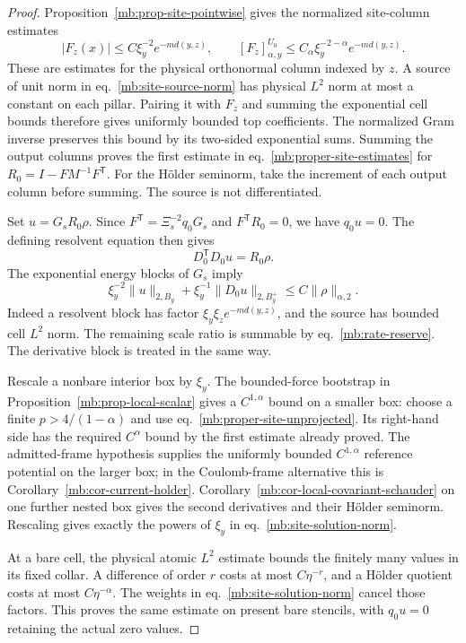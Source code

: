 \documentclass[11pt,letterpaper,reqno]{amsart}
\numberwithin{equation}{section}
\renewcommand{\eqref}[1]{\textup{eq.~\ref{#1}}}
\theoremstyle{definition}
\theoremstyle{remark}
\begin{document}
\begin{proof}
Proposition~\ref{mb:prop-site-pointwise} gives the normalized
site-column estimates
\[
 |F_z(x)|\le C\xi_y^{-2}e^{-m d(y,z)},\qquad
 [F_z]_{\alpha,y}^{U_0}
             \le C_\alpha\xi_y^{-2-\alpha}e^{-m d(y,z)}.
\]
These are estimates for the physical orthonormal column indexed
by $z$. A source of unit norm in \eqref{mb:site-source-norm}
has physical $L^2$ norm at most a constant on each pillar.
Pairing it with $F_z$ and summing the exponential cell bounds
therefore gives uniformly bounded top coefficients.
The normalized Gram inverse preserves this bound by its
two-sided exponential sums. Summing the output columns proves
the first estimate in \eqref{mb:proper-site-estimates} for
$R_0=I-FM^{-1}F^{\mathsf T}$. For the H\"older seminorm,
take the increment of each output column before summing.
The source is not differentiated.

Set $u=G_sR_0\rho$. Since
$F^{\mathsf T}=\Xi_s^{-2}q_0G_s$ and $F^{\mathsf T}R_0=0$,
we have $q_0u=0$. The defining resolvent equation then gives
\begin{equation}\label{mb:proper-site-unprojected}
                         D_0^{\mathsf T}D_0u=R_0\rho.
\end{equation}
The exponential energy blocks of $G_s$ imply
\[
 \xi_y^{-2}\|u\|_{2,B_y}
       +\xi_y^{-1}\|D_0u\|_{2,B_y^+}
                         \le C\|\rho\|_{\alpha,2}.
\]
Indeed a resolvent block has factor
$\xi_y\xi_z e^{-m d(y,z)}$, and the source has bounded
cell $L^2$ norm. The remaining scale ratio is summable by
\eqref{mb:rate-reserve}. The derivative block is treated in
the same way.

Rescale a nonbare interior box by $\xi_y$. The bounded-force
bootstrap in Proposition~\ref{mb:prop-local-scalar} gives a $C^{1,\alpha}$ bound
on a smaller box: choose a finite $p>4/(1-\alpha)$ and use
\eqref{mb:proper-site-unprojected}. Its right-hand side has
the required $C^\alpha$ bound by the first estimate already
proved. The admitted-frame hypothesis supplies the uniformly
bounded $C^{1,\alpha}$ reference potential on the larger box;
in the Coulomb-frame alternative this is
Corollary~\ref{mb:cor-current-holder}.
Corollary~\ref{mb:cor-local-covariant-schauder}
on one further nested box gives the second derivatives and
their H\"older seminorm. Rescaling gives exactly the powers
of $\xi_y$ in \eqref{mb:site-solution-norm}.

At a bare cell, the physical atomic $L^2$ estimate bounds the
finitely many values in its fixed collar. A difference of order
$r$ costs at most $C\eta^{-r}$, and a H\"older quotient costs
at most $C\eta^{-\alpha}$. The weights in
\eqref{mb:site-solution-norm} cancel those factors. This proves
the same estimate on present bare stencils, with $q_0u=0$
retaining the actual zero values.


\end{proof}
\end{document}
